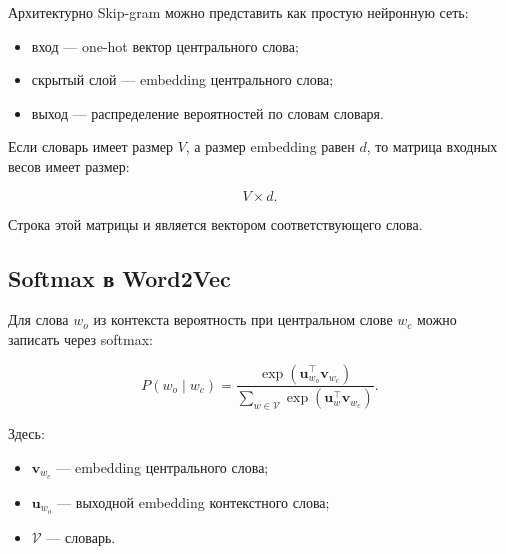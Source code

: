 \documentclass[a4paper,12pt]{article}
\begin{document}
Архитектурно Skip-gram можно представить как простую нейронную сеть:

\begin{itemize}
    \item вход --- one-hot вектор центрального слова;
    \item скрытый слой --- embedding центрального слова;
    \item выход --- распределение вероятностей по словам словаря.
\end{itemize}

Если словарь имеет размер \(V\), а размер embedding равен \(d\), то матрица входных весов имеет размер:

\[
V \times d.
\]

Строка этой матрицы и является вектором соответствующего слова.

%
%
%

\subsection{Softmax в Word2Vec}

Для слова \(w_o\) из контекста вероятность при центральном слове \(w_c\) можно записать через softmax:

\[
P(w_o \mid w_c)
=
\frac{
\exp(\bm{u}_{w_o}^{\top} \bm{v}_{w_c})
}{
\sum_{w \in \mathcal{V}}
\exp(\bm{u}_{w}^{\top} \bm{v}_{w_c})
}.
\]

Здесь:

\begin{itemize}
    \item \(\bm{v}_{w_c}\) --- embedding центрального слова;
    \item \(\bm{u}_{w_o}\) --- выходной embedding контекстного слова;
    \item \(\mathcal{V}\) --- словарь.
\end{itemize}
\end{document}
